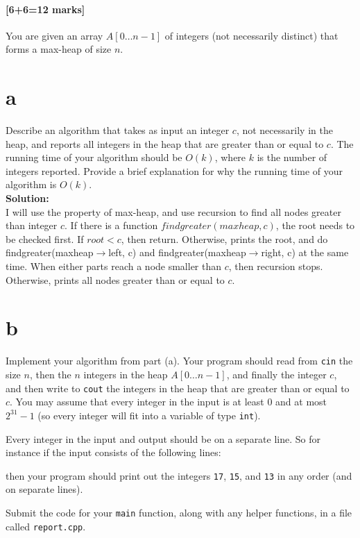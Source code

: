 \documentclass[12pt]{article}
\begin{document}
\subsection{[6+6=12 marks]}
You are given an array $A[0\ldots n-1]$ of integers (not necessarily
distinct) that forms a max-heap of size $n$.
\begin{itemize}
\part{a} Describe an algorithm that takes as input an integer $c$,
not necessarily in the heap, and reports all integers in the heap
that are greater than or equal to $c$.  The running time of your
algorithm should be $O(k)$, where $k$ is the number of integers
reported. Provide a brief explanation for why the running time of
your algorithm is $O(k)$.
\\\textbf{Solution: }
\\I will use the property of max-heap, and use recursion to find all nodes greater than integer $c$. If there is a function $findgreater(maxheap, c)$, the root needs to be checked first. If $root < c$, then return. Otherwise, prints the root, and do findgreater(maxheap$\rightarrow$left, c) and findgreater(maxheap$\rightarrow$right, c) at the same time. When either parts reach a node smaller than $c$, then recursion stops. Otherwise, prints all nodes greater than or equal to $c$.
\part{b} Implement your algorithm from part (a).
Your program should read from {\tt cin} the size $n$, then the $n$
integers in the heap $A[0\ldots n-1]$, and finally the integer $c$,
and then write to {\tt cout} the integers in the heap that are greater
than or equal to $c$. You may assume that every integer in the input
is at least 0 and at most $2^{31}-1$ (so every integer will fit into a
variable of type \verb|int|).

Every integer in the input and output should be on a separate line.
So for instance if the input consists of the following lines:

\begin{center}\end{center}

then your program should print out the integers \verb|17|, \verb|15|,
and \verb|13| in any order (and on separate lines).

Submit the code for your \verb|main| function, along with any helper
functions, in a file called \verb|report.cpp|.

\end{itemize}
\end{document}

